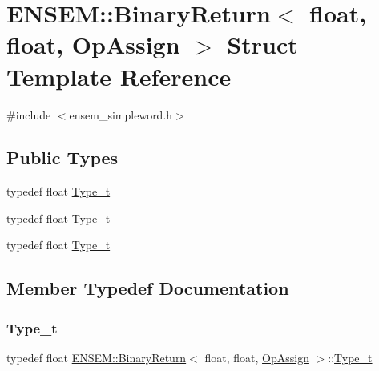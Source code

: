 \hypertarget{structENSEM_1_1BinaryReturn_3_01float_00_01float_00_01OpAssign_01_4}{}\section{E\+N\+S\+EM\+:\+:Binary\+Return$<$ float, float, Op\+Assign $>$ Struct Template Reference}
\label{structENSEM_1_1BinaryReturn_3_01float_00_01float_00_01OpAssign_01_4}


{\ttfamily \#include $<$ensem\+\_\+simpleword.\+h$>$}

\subsection*{Public Types}
\begin{DoxyCompactItemize}
\item 
typedef float \mbox{\hyperlink{structENSEM_1_1BinaryReturn_3_01float_00_01float_00_01OpAssign_01_4_a65f1032b48415f3cc75ef4be460c1b06}{Type\+\_\+t}}
\item 
typedef float \mbox{\hyperlink{structENSEM_1_1BinaryReturn_3_01float_00_01float_00_01OpAssign_01_4_a65f1032b48415f3cc75ef4be460c1b06}{Type\+\_\+t}}
\item 
typedef float \mbox{\hyperlink{structENSEM_1_1BinaryReturn_3_01float_00_01float_00_01OpAssign_01_4_a65f1032b48415f3cc75ef4be460c1b06}{Type\+\_\+t}}
\end{DoxyCompactItemize}


\subsection{Member Typedef Documentation}
\mbox{\label{structENSEM_1_1BinaryReturn_3_01float_00_01float_00_01OpAssign_01_4_a65f1032b48415f3cc75ef4be460c1b06}} 
\subsubsection{\texorpdfstring{Type\_t}{Type\_t}\hspace{0.1cm}{\footnotesize\ttfamily [1/3]}}
{\footnotesize\ttfamily typedef float \mbox{\hyperlink{structENSEM_1_1BinaryReturn}{E\+N\+S\+E\+M\+::\+Binary\+Return}}$<$ float, float, \mbox{\hyperlink{structENSEM_1_1OpAssign}{Op\+Assign}} $>$\+::\mbox{\hyperlink{structENSEM_1_1BinaryReturn_3_01float_00_01float_00_01OpAssign_01_4_a65f1032b48415f3cc75ef4be460c1b06}{Type\+\_\+t}}}

